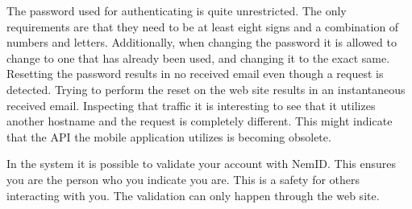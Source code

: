 The password used for authenticating is quite unrestricted. The only requirements are that they need to be at least eight signs and a combination of numbers and letters. Additionally, when changing the password it is allowed to change to one that has already been used, and changing it to the exact same. Resetting the password results in no received email even though a request is detected. Trying to perform the reset on the web site results in an instantaneous received email. Inspecting that traffic it is interesting to see that it utilizes another hostname and the request is completely different. This might indicate that the API the mobile application utilizes is becoming obsolete.     

In the system it is possible to validate your account with NemID. This ensures you are the person who you indicate you are. This is a safety for others interacting with you. The validation can only happen through the web site. 

